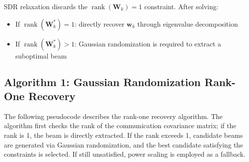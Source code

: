 \documentclass[12pt,a4paper]{article}
\newcommand{\vect}[1]{\mathbf{#1}}
\newcommand{\mat}[1]{\mathbf{#1}}
\DeclareMathOperator{\rank}{rank}
\begin{document}
SDR relaxation discards the $\rank(\mat{W}_k) = 1$ constraint. After solving:
\begin{itemize}
    \item If $\rank(\mat{W}_k^*) = 1$: directly recover $\vect{w}_k$ through eigenvalue decomposition
    \item If $\rank(\mat{W}_k^*) > 1$: Gaussian randomization is required to extract a suboptimal beam
\end{itemize}

\subsection{Algorithm 1: Gaussian Randomization Rank-One Recovery}

The following pseudocode describes the rank-one recovery algorithm. The algorithm first checks the rank of the communication covariance matrix; if the rank is 1, the beam is directly extracted. If the rank exceeds 1, candidate beams are generated via Gaussian randomization, and the best candidate satisfying the constraints is selected. If still unsatisfied, power scaling is employed as a fallback.
\end{document}
